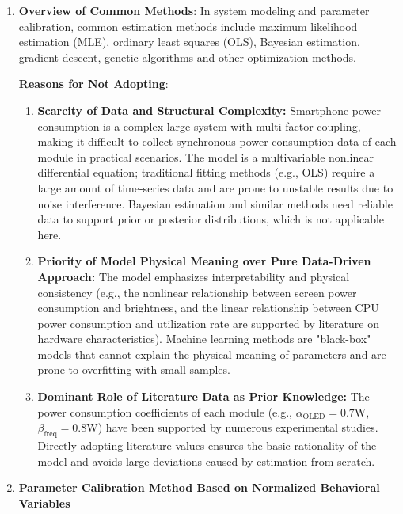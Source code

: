 \documentclass{mcmthesis}  %
\begin{document}
	\begin{enumerate}[label=\bfseries\arabic*.]
		\item \textbf{Overview of Common Methods}: In system modeling and parameter calibration, common estimation methods include maximum likelihood estimation (MLE), ordinary least squares (OLS), Bayesian estimation, gradient descent, genetic algorithms and other optimization methods.
		
		\textbf{Reasons for Not Adopting}:
		
		\begin{enumerate}[label=\textbf{(\arabic*)}]
			\item \textbf{Scarcity of Data and Structural Complexity:} Smartphone power consumption is a complex large system with multi-factor coupling, making it difficult to collect synchronous power consumption data of each module in practical scenarios. The model is a multivariable nonlinear differential equation; traditional fitting methods (e.g., OLS) require a large amount of time-series data and are prone to unstable results due to noise interference. Bayesian estimation and similar methods need reliable data to support prior or posterior distributions, which is not applicable here.
			\item \textbf{Priority of Model Physical Meaning over Pure Data-Driven Approach:} The model emphasizes interpretability and physical consistency (e.g., the nonlinear relationship between screen power consumption and brightness, and the linear relationship between CPU power consumption and utilization rate are supported by literature on hardware characteristics). Machine learning methods  are "black-box" models that cannot explain the physical meaning of parameters and are prone to overfitting with small samples.
			\item \textbf{Dominant Role of Literature Data as Prior Knowledge:} The power consumption coefficients of each module (e.g., $\alpha_{\text{OLED}}=0.7\text{W}$, $\beta_{\text{freq}}=0.8\text{W}$) have been supported by numerous experimental studies. Directly adopting literature values ensures the basic rationality of the model and avoids large deviations caused by estimation from scratch.
		\end{enumerate}
		
		\item \textbf{Parameter Calibration Method Based on Normalized Behavioral Variables}
		

\end{enumerate}
\end{document}
